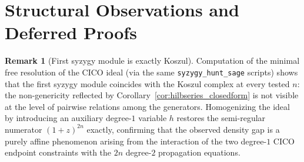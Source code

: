 \documentclass[11pt,a4paper]{article}
\theoremstyle{definition}
\newtheorem{remark}[theorem]{Remark}
\begin{document}
\section{Structural Observations and Deferred Proofs}\label{app:structural}

\begin{remark}[First syzygy module is exactly Koszul]\label{rem:first_syz_koszul}
Computation of the minimal free resolution of the CICO ideal (via the
same \texttt{syzygy\_hunt\_sage} scripts) shows that the first syzygy
module coincides with the Koszul complex at every tested $n$: the
non-genericity reflected by Corollary~\ref{cor:hilbseries_closedform}
is not visible at the level of pairwise relations among the generators.
Homogenizing the ideal by introducing an auxiliary degree-$1$ variable
$h$ restores the semi-regular numerator $(1+z)^{2n}$ exactly, confirming
that the observed density gap is a purely affine phenomenon arising
from the interaction of the two degree-$1$ CICO endpoint constraints
with the $2n$ degree-$2$ propagation equations.
\end{remark}
\end{document}
